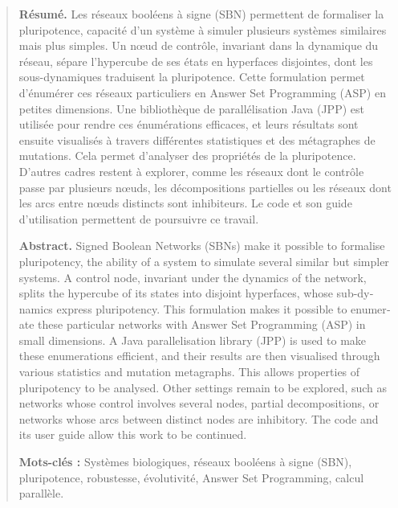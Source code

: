 \documentclass[12pt, a4paper]{article}
\begin{document}
\begin{quotation}\small %
\noindent
\textbf{Résumé.}
Les réseaux booléens à signe (SBN) permettent de formaliser la pluripotence, capacité d'un système à simuler plusieurs systèmes similaires mais plus simples.
Un nœud de contrôle, invariant dans la dynamique du réseau, sépare l'hypercube de ses états en hyperfaces disjointes, dont les sous-dynamiques traduisent la pluripotence.
Cette formulation permet d'énumérer ces réseaux particuliers en Answer Set Programming (ASP) en petites dimensions.
Une bibliothèque de parallélisation Java (JPP) est utilisée pour rendre ces énumérations efficaces, et leurs résultats sont ensuite visualisés à travers différentes statistiques et des métagraphes de mutations.
Cela permet d'analyser des propriétés de la pluripotence.
D'autres cadres restent à explorer, comme les réseaux dont le contrôle passe par plusieurs nœuds, les décompositions partielles ou les réseaux dont les arcs entre nœuds distincts sont inhibiteurs.
Le code et son guide d'utilisation permettent de poursuivre ce travail.

\bigskip
\noindent
\textbf{Abstract.}
\foreignlanguage{english}{%
Signed Boolean Networks (SBNs) make it possible to formalise pluripotency, the ability of a system to simulate several similar but simpler systems.
A control node, invariant under the dynamics of the network, splits the hypercube of its states into disjoint hyperfaces, whose sub-dynamics express pluripotency.
This formulation makes it possible to enumerate these particular networks with Answer Set Programming (ASP) in small dimensions.
A Java parallelisation library (JPP) is used to make these enumerations efficient, and their results are then visualised through various statistics and mutation metagraphs.
This allows properties of pluripotency to be analysed.
Other settings remain to be explored, such as networks whose control involves several nodes, partial decompositions, or networks whose arcs between distinct nodes are inhibitory.
The code and its user guide allow this work to be continued.}

\bigskip
\noindent
\textbf{Mots-clés :} Systèmes biologiques, réseaux booléens à signe (SBN), pluripotence, robustesse, évolutivité,
Answer Set Programming, calcul parallèle.
\end{quotation}
\end{document}
